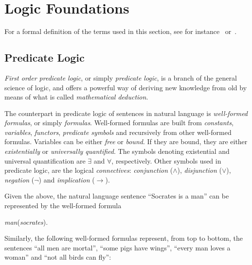 
\section{Logic Foundations}
\label{logic}

For a formal definition of the terms used in this section, see for
instance~\cite{logic} or~\cite{nilsson}.

\subsection{Predicate Logic}
\label{predicate}

{\em First order predicate logic\/}, or simply {\em predicate
logic\/}, is a branch of the general science of logic, and offers a
powerful way of deriving new knowledge from old by means of what is
called {\em mathematical deduction\/}.

The counterpart in predicate logic of sentences in natural language is
{\em well-formed formulas\/}, or simply {\em formulas\/}. Well-formed
formulas are built from {\em constants\/}, {\em variables\/}, {\em
functors\/}, {\em predicate symbols\/} and recursively from other
well-formed formulas.  Variables can be either {\em free\/} or {\em
bound\/}. If they are bound, they are either {\em existentially\/} or
{\em universally quantified\/}. The symbols denoting existential and
universal quantification are $\exists$ and $\forall$, respectively.
Other symbols used in predicate logic, are the logical {\em
connectives\/}: {\em conjunction\/} ($\wedge$), {\em disjunction\/}
($\vee$), {\em negation\/} ($\neg$) and {\em implication\/}
($\rightarrow$).

Given the above, the natural language sentence ``Socrates is a man''
can be represented by the well-formed formula

\begin{center}
  {\em man\/}({\em socrates\/}).
\end{center}

\noindent Similarly, the following well-formed formulas represent,
from top to bottom, the sentences ``all men are mortal'', ``some pigs
have wings'', ``every man loves a woman'' and ``not all birds can
fly'':

